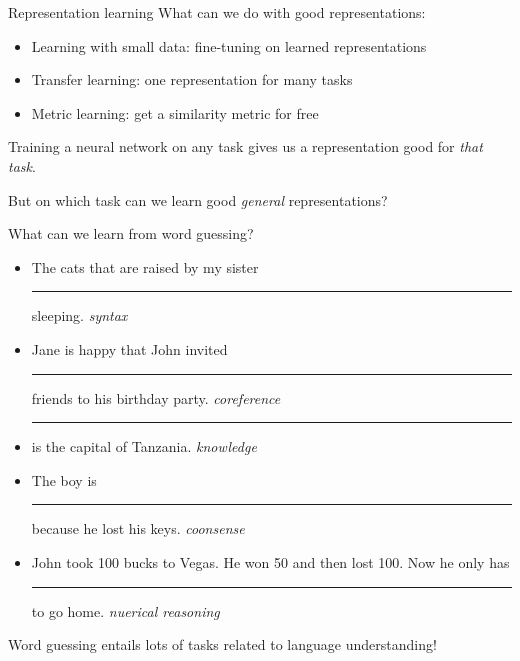 \documentclass[usenames,dvipsnames,notes,11pt,aspectratio=169,hyperref={colorlinks=true, linkcolor=blue}]{beamer}
\begin{document}
\begin{frame}
    {Representation learning}
    What can we do with good representations:\\
    \begin{itemize}
        \item Learning with small data: fine-tuning on learned representations
        \item Transfer learning: one representation for many tasks 
        \item Metric learning: get a similarity metric for free 
    \end{itemize}

    \pause
    Training a neural network on any task gives us a representation good for \textit{that task}.

    But on which task can we learn good \textit{general} representations?
\end{frame}

\begin{frame}
    {What can we learn from word guessing?}
    \begin{itemize}
        \itemsep1em
        \item The cats that are raised by my sister \rule{1.5cm}{0.5mm} sleeping. \pause\hfill \textit{syntax}
        \item Jane is happy that John invited \rule{1.5cm}{0.5mm} friends to his birthday party. \pause\hfill \textit{coreference}
        \item \rule{1.5cm}{0.5mm} is the capital of Tanzania. \pause\hfill \textit{knowledge}
        \item The boy is \rule{1.5cm}{0.5mm} because he lost his keys.  \pause\hfill \textit{coonsense}
        \item John took 100 bucks to Vegas. He won 50 and then lost 100. Now he only has \rule{1.5cm}{0.5mm} to go home. \pause\hfill \textit{nuerical reasoning}
    \end{itemize}

    \pause\bigskip
    Word guessing entails lots of tasks related to language understanding!
\end{frame}
\end{document}
